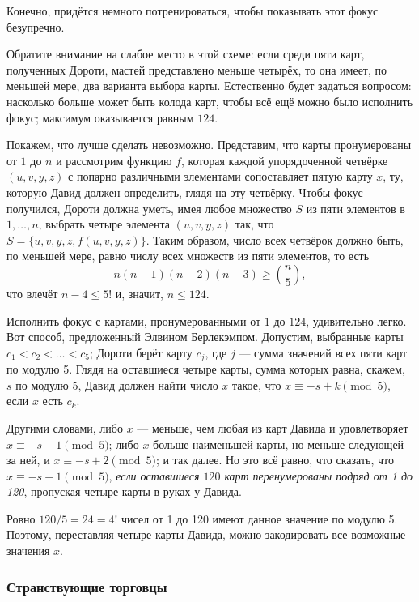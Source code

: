 Конечно, придётся немного потренироваться, чтобы показывать этот фокус безупречно.

\medskip

Обратите внимание на слабое место в этой схеме: если среди пяти карт, полученных Дороти, мастей представлено меньше четырёх, то она имеет, по меньшей мере, два варианта выбора карты.
Естественно будет задаться вопросом: насколько больше может быть колода карт, чтобы всё ещё можно было исполнить фокус;
максимум оказывается равным $124$.

Покажем, что лучше сделать невозможно.
Представим, что карты пронумерованы от $1$ до $n$ и рассмотрим функцию $f$, которая каждой упорядоченной четвёрке $(u,v,y,z)$ с попарно различными элементами сопоставляет пятую карту $x$, ту, которую Давид должен определить, глядя на эту четвёрку.
Чтобы фокус получился, Дороти должна уметь, имея
любое множество $S$ из пяти элементов в ${1, \dots, n}$, выбрать четыре элемента $(u,v,y,z)$ так, что $S = \{u,v,y,z, f(u,v,y,z)\}$.
Таким образом, число всех четвёрок должно быть, по меньшей мере, равно числу всех множеств из пяти элементов, то есть
\[n(n - 1)(n - 2)(n - 3)\ge \binom n5,\]
что влечёт $n - 4 \le5!$ и, значит, $n\le 124$.


Исполнить фокус с картами, пронумерованными от $1$ до $124$, удивительно легко.
Вот способ, предложенный Элвином Берлекэмпом.
Допустим, выбранные карты $c_1 < c_2 < \dots < c_5$;
Дороти берёт карту $c_j$, где $j$ --- сумма значений всех пяти карт по модулю 5.
Глядя на оставшиеся четыре карты, сумма которых равна, скажем, $s$ по модулю 5, Давид должен найти число $x$ такое, что $x\equiv -s + k \pmod 5$, если $x$ есть $c_k$.

Другими словами, либо $x$ --- меньше, чем любая из карт Давида и удовлетворяет 
$x\equiv-s + 1 \pmod 5$; либо $x$ больше наименьшей карты, но меньше следующей за ней, и 
$x\equiv -s + 2 \pmod 5$; и так далее.
Но это всё равно, что сказать, что $x\equiv -s + 1 \pmod 5$,
\emph{если оставшиеся $120$ карт перенумерованы подряд от 1 до 120},
пропуская четыре карты в руках у Давида.

Ровно $120/5 = 24 = 4!$ чисел от 1 до 120 имеют данное значение по модулю 5.
Поэтому, переставляя четыре карты Давида, можно закодировать все возможные значения $x$.
\heart

\subsubsection*{Странствующие торговцы} %

